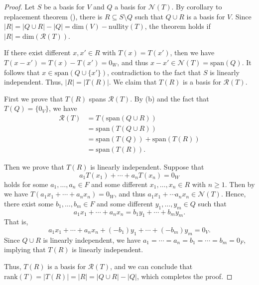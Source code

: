 \begin{proof}
  Let $S$ be a basis for $V$ and $Q$ a basis for $\mathcal{N}(T)$.
  By corollary to replacement theorem (), there is
  $R \subseteq S \setminus Q$ such that $Q \cup R$ is a basis for $V$.
  Since $|R| = |Q \cup R| - |Q| = \mathrm{dim}(V) - \mathrm{nullity}(T)$,
  the theorem holds if $|R| = \mathrm{dim}(\mathcal{R}(T))$.
  
  If there exist different $x, x' \in R$ with $T(x) = T(x')$, then we have
  $T(x - x') = T(x) - T(x') = 0_W$, and thus
  $x - x' \in \mathcal{N}(T) = \mathrm{span}(Q)$.
  It follows that $x \in \mathrm{span}(Q \cup \{x'\})$,
  contradiction to the fact that $S$ is linearly independent.
  Thus, $|R| = |T(R)|$. We claim that $T(R)$ is a basis for $\mathcal{R}(T)$.

  First we prove that $T(R)$ spans $\mathcal{R}(T)$.
  By  (b) and the fact that $T(Q) = \{0_V\}$, we have
  \begin{align*}
    \mathcal{R}(T) &= T(\mathrm{span}(Q \cup R)) \\
                   &= \mathrm{span}(T(Q \cup R)) \\
                   &= \mathrm{span}(T(Q)) + \mathrm{span}(T(R)) \\
                   &= \mathrm{span}(T(R)).
  \end{align*}

  Then we prove that $T(R)$ is linearly independent.
  Suppose that
  \begin{equation*}
    a_1T(x_1) + \cdots + a_nT(x_n) = 0_W
  \end{equation*}
  holds for some $a_1, \dots, a_n \in F$ and some different
  $x_1, \dots, x_n \in R$ with $n \geq 1$.
  Then by  we have $T(a_1x_1 + \cdots + a_nx_n) = 0_W$,
  and thus $a_1x_1 + \cdots a_nx_n \in \mathcal{N}(T)$.
  Hence, there exist some $b_1, \dots, b_m \in F$ and some different
  $y_1, \dots, y_m \in Q$ such that
  \begin{equation*}
    a_1x_1 + \cdots + a_nx_n = b_1y_1 + \cdots + b_my_m.
  \end{equation*}
  That is,
  \begin{equation*}
    a_1x_1 + \cdots + a_nx_n + (-b_1)y_1 + \cdots + (-b_m)y_m = 0_V.
  \end{equation*}
  Since $Q \cup R$ is linearly independent, we have
  $a_1 = \cdots = a_n = b_1 = \cdots = b_m = 0_F$, implying that $T(R)$ is
  linearly independent.

  Thus, $T(R)$ is a basis for $\mathcal{R}(T)$, and we can conclude that
  $\mathrm{rank}(T) = |T(R)| = |R| = |Q \cup R| - |Q|$,
  which completes the proof.
\end{proof}